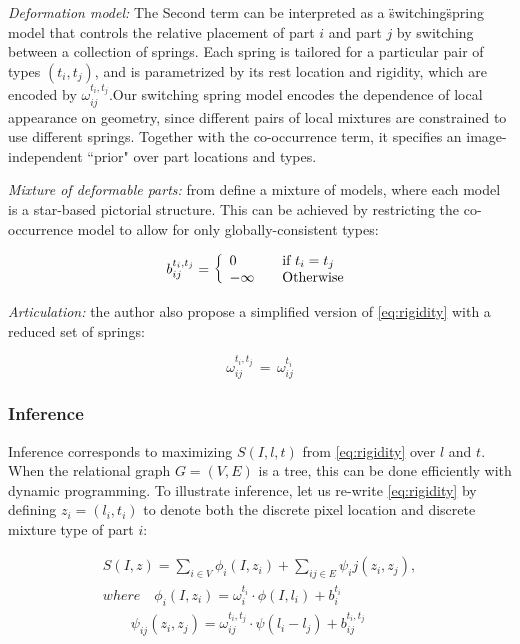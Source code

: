\textit{Deformation model:} The Second term can be interpreted as a \"switching\"
spring model that controls the relative placement of part $i$ and part $j$ by switching
between a collection of springs. Each spring is tailored for a particular pair of 
types $(t_i,t_j)$, and is parametrized by its rest location and rigidity, which are 
encoded by $\omega_{ij}^{t_i, t_j}$.Our switching spring model encodes the dependence
of local appearance on geometry, since different pairs of local mixtures are constrained
to use different springs. Together with the co-occurrence term, it specifies an
image-independent ``prior" over part locations and types.

\textit{Mixture of deformable parts: } from \citet{Felzenszwalb2010} define a mixture of models, where each model is a star-based pictorial structure. This can be achieved by restricting the
co-occurrence model to allow for only globally-consistent types:

\begin{equation}
b_{ij}^{t_i,t_j}=\left\{ 
  \begin{array}{l l}
	0 & \quad \text{if $t_i=t_j$}\\
    -\infty & \quad \text{Otherwise}
  \end{array} \right.
\end{equation}

\textit{Articulation: } the author also propose a simplified version of \ref{eq:rigidity}
with a reduced set of springs:

\begin{equation}
\omega_{ij}^{t_i,t_j}\,=\,\omega_{ij}^{t_i}
\end{equation}


\subsubsection{Inference}
Inference corresponds to maximizing $S(I,l,t)$ from \ref{eq:rigidity} over $l$ and $t$.
When the relational graph $G=(V,E)$ is a tree, this can be done efficiently with 
dynamic programming. To illustrate inference, let us re-write \ref{eq:rigidity} by
defining $z_i = (l_i,t_i)$ to denote both the discrete pixel location and discrete
mixture type of part $i$:

\begin{equation}
\begin{split}
S(I,z) = \sum_{i \in V} \phi_i(I,z_i) + \sum_{ij \in E} \psi_ij(z_i,z_j), \\
where \quad \phi_i(I,z_i) = \omega_i^{t_i} \cdot \phi(I,l_i) + b_i^{t_i} \\
\quad \quad \psi_{ij}(z_i,z_j)=\omega_{ij}^{t_i,t_j} \cdot \psi(l_i -l_j)+b_{ij}^{t_i,t_j}
\end{split}
\end{equation}

